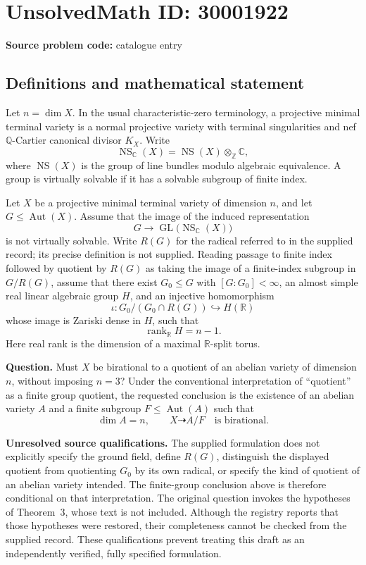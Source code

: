 \documentclass[11pt]{article}
\begin{document}
\section*{UnsolvedMath ID: 30001922}
\textbf{Source problem code:} catalogue entry
\subsection{Definitions and mathematical statement}
Let \(n=\dim X\). In the usual characteristic-zero terminology, a projective minimal terminal variety is a normal projective variety with terminal singularities and nef \(\mathbb Q\)-Cartier canonical divisor \(K_X\). Write
\[
\operatorname{NS}_{\mathbb C}(X)=\operatorname{NS}(X)\otimes_{\mathbb Z}\mathbb C,
\]
where \(\operatorname{NS}(X)\) is the group of line bundles modulo algebraic equivalence. A group is virtually solvable if it has a solvable subgroup of finite index.

Let \(X\) be a projective minimal terminal variety of dimension \(n\), and let \(G\leq\operatorname{Aut}(X)\). Assume that the image of the induced representation
\[
G\longrightarrow\operatorname{GL}\bigl(\operatorname{NS}_{\mathbb C}(X)\bigr)
\]
is not virtually solvable. Write \(R(G)\) for the radical referred to in the supplied record; its precise definition is not supplied. Reading passage to finite index followed by quotient by \(R(G)\) as taking the image of a finite-index subgroup in \(G/R(G)\), assume that there exist \(G_0\leq G\) with \([G:G_0]<\infty\), an almost simple real linear algebraic group \(H\), and an injective homomorphism
\[
\iota:G_0/(G_0\cap R(G))\hookrightarrow H(\mathbb R)
\]
whose image is Zariski dense in \(H\), such that
\[
\operatorname{rank}_{\mathbb R}H=n-1.
\]
Here real rank is the dimension of a maximal \(\mathbb R\)-split torus.

\textbf{Question.} Must \(X\) be birational to a quotient of an abelian variety of dimension \(n\), without imposing \(n=3\)? Under the conventional interpretation of ``quotient'' as a finite group quotient, the requested conclusion is the existence of an abelian variety \(A\) and a finite subgroup \(F\leq\operatorname{Aut}(A)\) such that
\[
\dim A=n,\qquad X\dashrightarrow A/F\quad\text{is birational}.
\]

\textbf{Unresolved source qualifications.} The supplied formulation does not explicitly specify the ground field, define \(R(G)\), distinguish the displayed quotient from quotienting \(G_0\) by its own radical, or specify the kind of quotient of an abelian variety intended. The finite-group conclusion above is therefore conditional on that interpretation. The original question invokes the hypotheses of Theorem~3, whose text is not included. Although the registry reports that those hypotheses were restored, their completeness cannot be checked from the supplied record. These qualifications prevent treating this draft as an independently verified, fully specified formulation.
\end{document}
